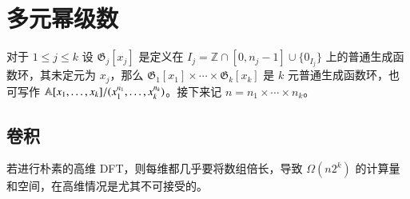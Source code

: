 




\section{多元幂级数}

\begin{definition}
对于 $1\le j\le k$ 设 $\mathfrak G_j[x_j]$ 是定义在 $I_j = \mathbb Z\cap[0,n_j-1] \cup \{0_{I_j}\}$ 上的普通生成函数环，其未定元为 $x_j$，那么 $\mathfrak G_1[x_1]\times \cdots \times \mathfrak G_k[x_k]$ 是 $k$ 元普通生成函数环，也可写作 $\mathbb A[x_1,\dots,x_k]/(x_1^{n_1},\dots,x_k^{n_k})$。接下来记 $n = n_1 \times \cdots \times n_k$。
\end{definition}

\subsection{卷积}

若进行朴素的高维 DFT，则每维都几乎要将数组倍长，导致 $\Omega(n2^k)$ 的计算量和空间，在高维情况是尤其不可接受的。

